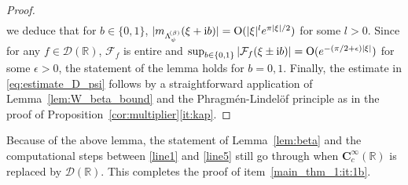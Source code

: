 \documentclass[12pt]{amsart}
\newcommand{\hlabel}{\phantomsection\label}
\numberwithin{equation}{section}
\newcommand{\bb}{\mathbb}
\newcommand{\cc}{\mathcal}
\renewcommand{\le}{\leqslant}
\renewcommand{\Re}{\textrm{Re}}
\newcommand{\hpt}[2]{#2}
\newcommand{\bmrm}[2][2]{\mathbf{#2}^{#1}}
\newcommand{\C}{\mathbf{C}}
\newcommand{\A}{\mathbf{A}}
\newcommand{\eps}{\epsilon}
\renewcommand{\i}{\mathrm{i}}
\newcommand{\LRe}{\bmrm{L}(\bb{R},e)}
\newcommand{\NN}{\mathbf{N}}
\theoremstyle{definition}
\theoremstyle{assump}
\theoremstyle{remark}
\newtheorem{rem}[thm]{Remark}
\begin{document}
{\begin{proof}
\begin{align*}
	\end{align*}
we deduce that for $b\in\{0,1\}$, $|m_{\Lambda^{\!(\beta)}_\psi}(\xi+\i b)|={\rm O}(|\xi|^l e^{\pi |\xi|/2})$ for some $l>0$. Since for any $f\in\cc{D}(\bb R)$, $\cc{F}_f$ is entire and $\sup_{b\in\{0,1\}}|\cc{F}_f(\xi\pm\i b)|={\rm O}(e^{-(\pi/2+\eps)|\xi|})$ for some $\eps>0$, the statement of the lemma holds for $b=0,1$. \hpt{R25}{Finally, the estimate in \eqref{eq:estimate_D_psi} follows by a straightforward application of Lemma~\ref{lem:W_beta_bound} and the Phragm\'en-Lindel\"of principle as in the proof of Proposition~\ref{cor:multiplier}\eqref{it:kap}.}
\end{proof}
Because of the above lemma, the statement of Lemma~\ref{lem:beta} and the computational steps between \eqref{line1} and \eqref{line5} still go through when $\C^\infty_c(\bb R)$ is replaced by $\cc{D}(\bb R)$. This completes the proof of item~\eqref{main_thm_1:it:1b}.



}
\end{document}

